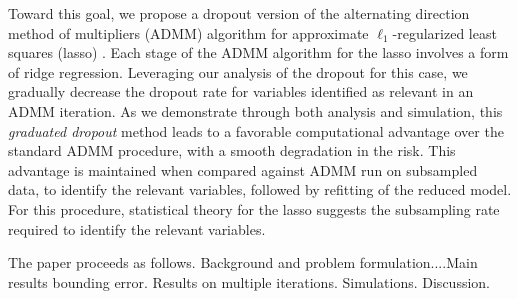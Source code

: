Toward this goal, we propose a dropout version of the
alternating direction method of multipliers (ADMM) algorithm for
approximate $\ell_1$-regularized least squares (lasso) \citep{Boyd:2011}.  Each stage of
the ADMM algorithm for the lasso involves a form of ridge regression.
Leveraging our analysis of the dropout for this case, we gradually
decrease the dropout rate for variables identified as relevant in an
ADMM iteration.  As we demonstrate through both analysis and
simulation, this \textit{graduated dropout} method leads to a favorable
computational advantage over the standard ADMM procedure, with a
smooth degradation in the risk.  This advantage is maintained
when compared against ADMM run on subsampled data, to identify 
the relevant variables, followed by refitting of the reduced model.
For this procedure, statistical theory for the lasso suggests
the subsampling rate required to identify the relevant variables.

The paper proceeds as follows.  Background 
and problem formulation....Main results bounding
error.  Results on multiple iterations.  Simulations.
Discussion.

